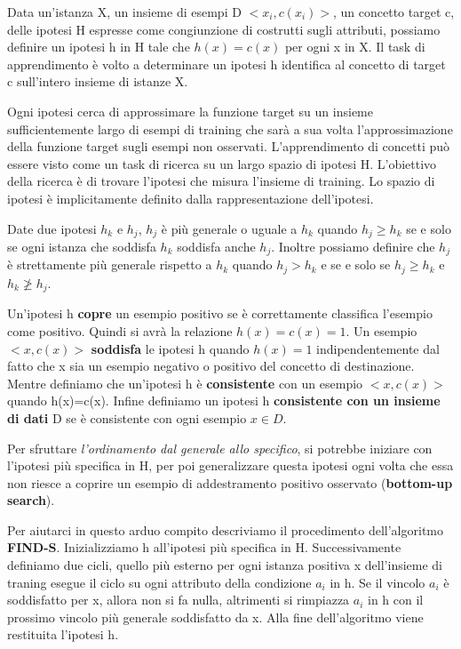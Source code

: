 \documentclass[a4paper]{extarticle}
\begin{document}
\begin{center}
Data un'istanza X, un insieme di esempi D $<x_i,c(x_i)>$, un concetto target c, delle ipotesi H espresse come congiunzione di costrutti sugli attributi, possiamo definire un ipotesi h in H tale che $h(x)=c(x)$ per ogni x in X. Il task di apprendimento è volto a determinare un ipotesi h identifica al concetto di target c sull'intero insieme di istanze X.
\end{center}

Ogni ipotesi cerca di approssimare la funzione target su un insieme sufficientemente largo di esempi di training che sarà a sua volta l'approssimazione della funzione target sugli esempi non osservati. L'apprendimento di concetti può essere visto come un task di ricerca su un largo spazio di ipotesi H. L'obiettivo della ricerca è di trovare l'ipotesi che misura l'insieme di training. Lo spazio di ipotesi è implicitamente definito dalla rappresentazione dell'ipotesi.

Date due ipotesi $h_k$ e $h_j$, $h_j$ è più generale o uguale a $h_k$ quando $h_j \geq h_k$ se e solo se ogni istanza che soddisfa $h_k$ soddisfa anche $h_j$. Inoltre possiamo definire che $h_j$ è strettamente più generale rispetto a $h_k$ quando $h_j > h_k$ e se e solo se $h_j \geq h_k$ e $h_k \not \geq h_j$.

Un'ipotesi h \textbf{copre} un esempio positivo se è correttamente classifica l'esempio come positivo. Quindi si avrà la relazione $h(x) = c(x) = 1$. Un esempio $<x,c(x)>$ \textbf{soddisfa} le ipotesi h quando $h(x) = 1$ indipendentemente dal fatto che x sia un esempio negativo o positivo del concetto di destinazione. Mentre definiamo che un'ipotesi h è \textbf{consistente} con un esempio $<x,c(x)>$ quando h(x)=c(x). Infine definiamo un ipotesi h \textbf{consistente con un insieme di dati} D se è consistente con ogni esempio $x \in D$.

Per sfruttare \textit{l'ordinamento dal generale allo specifico}, si potrebbe iniziare con l'ipotesi più specifica in H, per poi generalizzare questa ipotesi ogni volta che essa non riesce a coprire un esempio di addestramento positivo osservato (\textbf{bottom-up search}).

Per aiutarci in questo arduo compito descriviamo il procedimento dell'algoritmo \textbf{FIND-S}. Inizializziamo h all'ipotesi più specifica in H. Successivamente definiamo due cicli, quello più esterno per ogni istanza positiva x dell'insieme di traning esegue il ciclo su ogni attributo della condizione $a_i$ in h. Se il vincolo $a_i$ è soddisfatto per x, allora non si fa nulla, altrimenti si rimpiazza $a_i$ in h con il prossimo vincolo più generale soddisfatto da x. Alla fine dell'algoritmo viene restituita l'ipotesi h.
\end{document}
